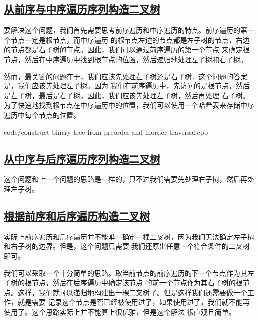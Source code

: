 \documentclass[../../main.tex]{subfiles}
\begin{document}
\subsection{\href{https://leetcode-cn.com/problems/construct-binary-tree-from-preorder-and-inorder-traversal/}
{从前序与中序遍历序列构造二叉树}}

要解决这个问题，我们首先需要思考前序遍历和中序遍历的特点。前序遍历的第一个节点一定是根节点，而中序遍历
的根节点左边的节点都是左子树的节点，右边的节点都是右子树的节点。因此，我们可以通过前序遍历的第一个节点
来确定根节点，然后在中序遍历中找到根节点的位置，然后递归地处理左子树和右子树。

然而，最关键的问题在于，我们应该先处理左子树还是右子树，这个问题的答案是，我们应该先处理左子树。因为
我们在前序遍历中，先访问的是根节点，然后是左子树，最后是右子树。因此，我们应该先处理左子树，然后再处理
右子树。为了快速地找到根节点在中序遍历中的位置，我们可以使用一个哈希表来存储中序遍历中每个节点的位置。


{code/construct-binary-tree-from-preorder-and-inorder-traversal.cpp}

\subsection{\href{https://leetcode-cn.com/problems/construct-binary-tree-from-inorder-and-postorder-traversal/}
{从中序与后序遍历序列构造二叉树}}

这个问题和上一个问题的思路是一样的，只不过我们需要先处理右子树，然后再处理左子树。



\subsection{\href{https://leetcode-cn.com/problems/construct-binary-tree-from-preorder-and-postorder-traversal/}
{根据前序和后序遍历构造二叉树}}

实际上前序遍历和后序遍历并不能唯一确定一棵二叉树，因为我们无法确定左子树和右子树的边界。但是，这个问题只需要
我们还原出任意一个符合条件的二叉树即可。

我们可以采取一个十分简单的思路。取当前节点的前序遍历的下一个节点作为其左子树的根节点，然后在后序遍历中确定该节点
的前一个节点作为其右子树的根节点。这样，我们就可以递归地构建出一棵二叉树了。但是这样我们还需要做一个工作，就是需要
记录这个节点是否已经被使用过了，如果使用过了，我们就不能再使用了。这个思路实际上并不能算上很优雅，但是这个解法
很直观且简单。
\end{document}
